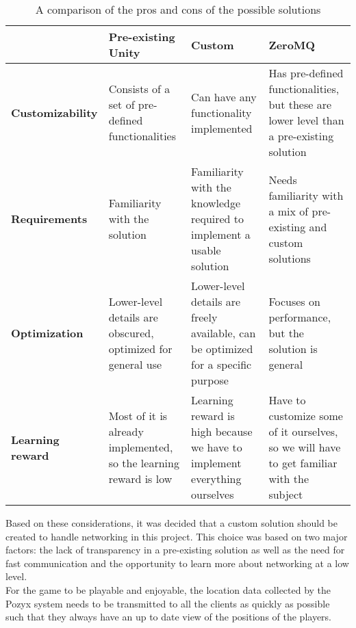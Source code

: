 \begin{table}[H]
    \begin{tabularx}{\textwidth}{|X|X|X|X|}
    \hline
        
            & \textbf{Pre-existing Unity}    
            & \textbf{Custom}
            & \textbf{ZeroMQ}  
            \\ \hline
        \textbf{Customizability} 
            & Consists of a set of pre-defined functionalities            
            & Can have any functionality implemented                                            
            & Has pre-defined functionalities, but these are lower level than a pre-existing solution 
            \\ \hline
        \textbf{Requirements}    
            & Familiarity with the solution                               
            & Familiarity with the knowledge required to implement a usable solution            
            & Needs familiarity with a mix of pre-existing and custom solutions                     
            \\ \hline
        \textbf{Optimization}    
            & Lower-level details are obscured, optimized for general use 
            & Lower-level details are freely available, can be optimized for a specific purpose 
            & Focuses on performance, but the solution is general                                     
            \\ \hline
        \textbf{Learning reward}
            & Most of it is already implemented, so the learning reward is low
            & Learning reward is high because we have to implement everything ourselves
            & Have to customize some of it ourselves, so we will have to get familiar with the subject
            \\ \hline
        \end{tabularx}
    \caption{A comparison of the pros and cons of the possible solutions}
    \label{tab:networkprosandcons}
\end{table}
\noindent
Based on these considerations, it was decided that a custom solution should be created to handle networking in this project.
This choice was based on two major factors: the lack of transparency in a pre-existing solution as well as the need for fast communication and the opportunity to learn more about networking at a low level. \\
For the game to be playable and enjoyable, the location data collected by the Pozyx system needs to be transmitted to all the clients as quickly as possible such that they always have an up to date view of the positions of the players.\\

